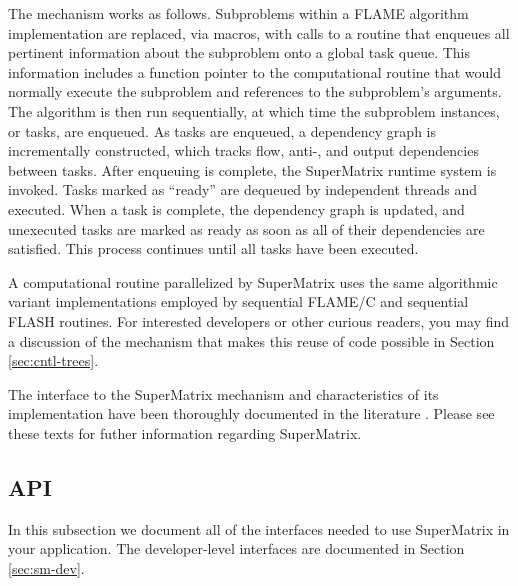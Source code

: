 The mechanism works as follows.
Subproblems within a FLAME algorithm implementation are replaced, via macros,
with calls to a routine that enqueues all pertinent information about the
subproblem onto a global task queue.
This information includes a function pointer to the computational routine
that would normally execute the subproblem and references to the subproblem's
arguments.
The algorithm is then run sequentially, at which time the subproblem instances,
or tasks, are enqueued.
As tasks are enqueued, a dependency graph is incrementally constructed, which
tracks flow, anti-, and output dependencies between tasks.
After enqueuing is complete, the SuperMatrix runtime system is invoked.
Tasks marked as ``ready'' are dequeued by independent threads and executed.
When a task is complete, the dependency graph is updated, and unexecuted tasks
are marked as ready as soon as all of their dependencies are satisfied.
This process continues until all tasks have been executed.

A computational routine parallelized by SuperMatrix uses the same algorithmic
variant implementations employed by sequential FLAME/C and sequential FLASH
routines.
For interested developers or other curious readers, you may find a discussion
of the mechanism that makes this reuse of code possible in Section
\ref{sec:cntl-trees}.

The interface to the SuperMatrix mechanism and characteristics of its \libflame
implementation have been thoroughly documented in the literature
\cite{SuperMatrix:PPoPP08,spaa2007}.
Please see these texts for futher information regarding SuperMatrix.




\subsection{API}

In this subsection we document all of the \libflame interfaces needed to use
SuperMatrix in your application.
The developer-level interfaces are documented in Section \ref{sec:sm-dev}.




